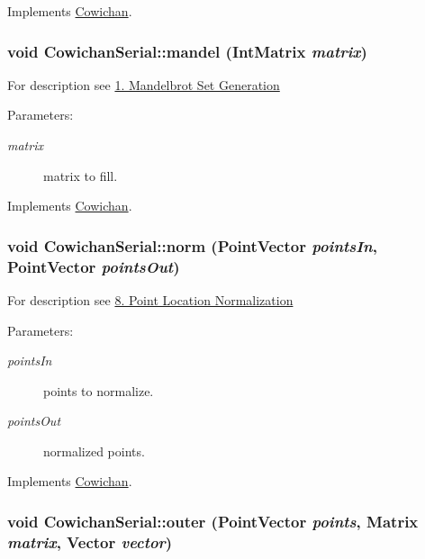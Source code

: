 Implements \hyperlink{class_cowichan_d449595ef2fe934bdd128ac8b1f51d07}{Cowichan}.\hypertarget{class_cowichan_serial_97a58b7901d8a7680cc28d42cb94d532}{
\subsubsection[{mandel}]{\setlength{\rightskip}{0pt plus 5cm}void CowichanSerial::mandel ({\bf IntMatrix} {\em matrix})}}
\label{class_cowichan_serial_97a58b7901d8a7680cc28d42cb94d532}


For description see \hyperlink{index_mandel_sec}{1. Mandelbrot Set Generation} \begin{Desc}
\item[Parameters:]
\begin{description}
\item[{\em matrix}]matrix to fill. \end{description}
\end{Desc}


Implements \hyperlink{class_cowichan_ec6cc4eb2ad444474b923532167e98a2}{Cowichan}.\hypertarget{class_cowichan_serial_0eeb47447c6a6b94ff7c6999c96fda0e}{
\subsubsection[{norm}]{\setlength{\rightskip}{0pt plus 5cm}void CowichanSerial::norm ({\bf PointVector} {\em pointsIn}, \/  {\bf PointVector} {\em pointsOut})}}
\label{class_cowichan_serial_0eeb47447c6a6b94ff7c6999c96fda0e}


For description see \hyperlink{index_norm_sec}{8. Point Location Normalization} \begin{Desc}
\item[Parameters:]
\begin{description}
\item[{\em pointsIn}]points to normalize. \item[{\em pointsOut}]normalized points. \end{description}
\end{Desc}


Implements \hyperlink{class_cowichan_3df21e3c627958114e045c3559a29f30}{Cowichan}.\hypertarget{class_cowichan_serial_05f6899081a457d58978e4f6bda2db6a}{
\subsubsection[{outer}]{\setlength{\rightskip}{0pt plus 5cm}void CowichanSerial::outer ({\bf PointVector} {\em points}, \/  {\bf Matrix} {\em matrix}, \/  {\bf Vector} {\em vector})}}
\label{class_cowichan_serial_05f6899081a457d58978e4f6bda2db6a}


